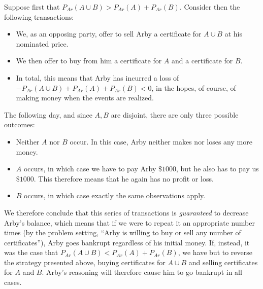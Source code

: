 \begin{solution}
    
    Suppose first that $P_{Ar}(A \cup B) > P_{Ar}(A) + P_{Ar}(B)$.
    Consider then the following transactions:
    \begin{itemize}
        \item We, as an opposing party, offer to sell Arby a certificate for $A \cup B$ at his nominated price.
        \item We then offer to buy from him a certificate for $A$ and a certificate for $B$.
        \item In total, this means that Arby has incurred a loss of $-P_{Ar}(A \cup B) + P_{Ar}(A) + P_{Ar}(B) < 0$, in the hopes, of course, of making money when the events are realized.
    \end{itemize}
    The following day, and since $A, B$ are disjoint, there are only three possible outcomes:
    \begin{itemize}
        \item Neither $A$ nor $B$ occur.
        In this case, Arby neither makes nor loses any more money.
        \item $A$ occurs, in which case we have to pay Arby $\$1000$, but he also has to pay us $\$1000$.
        This therefore means that he again has no profit or loss.
        \item $B$ occurs, in which case exactly the same observations apply.
    \end{itemize}
    We therefore conclude that this series of transactions is \textit{guaranteed} to decrease Arby's balance, which means that if we were to repeat it an appropriate number times (by the problem setting, ``Arby is willing to buy or sell any number of certificates''), Arby goes bankrupt regardless of his initial money.
    If, instead, it was the case that $P_{Ar}(A \cup B) < P_{Ar}(A) + P_{Ar}(B)$, we have but to reverse the strategy presented above, buying certificates for $A \cup B$ and selling certificates for $A$ and $B$.
    Arby's reasoning will therefore cause him to go bankrupt in all cases.
\end{solution}